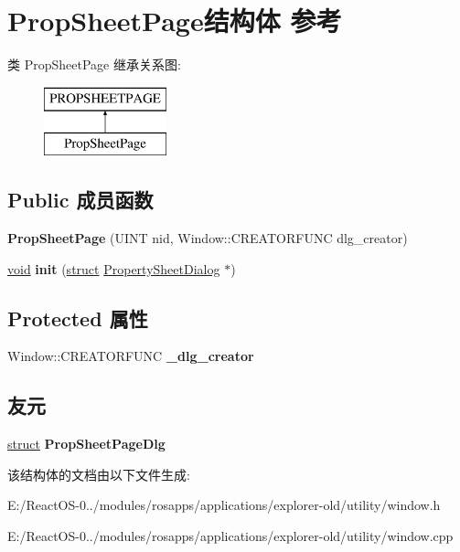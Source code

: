 \hypertarget{struct_prop_sheet_page}{}\section{Prop\+Sheet\+Page结构体 参考}
\label{struct_prop_sheet_page}
类 Prop\+Sheet\+Page 继承关系图\+:\begin{figure}[H]
\begin{center}
\leavevmode
\includegraphics[height=2.000000cm]{struct_prop_sheet_page}
\end{center}
\end{figure}
\subsection*{Public 成员函数}
\begin{DoxyCompactItemize}
\item 
\mbox{\label{struct_prop_sheet_page_a3aa18431d7b0d8346fd43549f98e56c8}} 
{\bfseries Prop\+Sheet\+Page} (U\+I\+NT nid, Window\+::\+C\+R\+E\+A\+T\+O\+R\+F\+U\+NC dlg\+\_\+creator)
\item 
\mbox{\label{struct_prop_sheet_page_af553e92ad2de326527aec7cc08369f9a}} 
\hyperlink{interfacevoid}{void} {\bfseries init} (\hyperlink{interfacestruct}{struct} \hyperlink{struct_property_sheet_dialog}{Property\+Sheet\+Dialog} $\ast$)
\end{DoxyCompactItemize}
\subsection*{Protected 属性}
\begin{DoxyCompactItemize}
\item 
\mbox{\label{struct_prop_sheet_page_aab551a8ae35a25ec9b85f175aa78d50f}} 
Window\+::\+C\+R\+E\+A\+T\+O\+R\+F\+U\+NC {\bfseries \+\_\+dlg\+\_\+creator}
\end{DoxyCompactItemize}
\subsection*{友元}
\begin{DoxyCompactItemize}
\item 
\mbox{\label{struct_prop_sheet_page_abc487cf01967743870764c40b383dd66}} 
\hyperlink{interfacestruct}{struct} {\bfseries Prop\+Sheet\+Page\+Dlg}
\end{DoxyCompactItemize}


该结构体的文档由以下文件生成\+:\begin{DoxyCompactItemize}
\item 
E\+:/\+React\+O\+S-\/0../modules/rosapps/applications/explorer-\/old/utility/window.\+h\item 
E\+:/\+React\+O\+S-\/0../modules/rosapps/applications/explorer-\/old/utility/window.\+cpp\end{DoxyCompactItemize}
